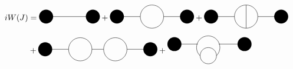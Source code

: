 \begin{equation}
    \begin{aligned}
    iW(J)&=
       \begin{gathered}
            \begin{tikzpicture}
                \draw (0,0) -- (2,0);
                \fill [black] (0,0) circle (0.3 cm);
                \fill [black] (2,0) circle (0.3 cm);
            \end{tikzpicture}
       \end{gathered}
       +\begin{gathered}
            \begin{tikzpicture}
                \fill [black] (0,0) circle (0.3 cm);
                \draw (0,0) -- (1,0);
                \draw (1.5,0) circle (0.5 cm);
                \draw (2,0) -- (3,0);
                \fill [black] (3,0) circle (0.3 cm);
            \end{tikzpicture}
       \end{gathered}+
       \begin{gathered}
            \begin{tikzpicture}
                \fill [black] (0,0) circle (0.3 cm);
                \draw (0,0) -- (1,0);
                \draw (1.5,0) circle (0.5 cm);
                \draw (2,0) -- (3,0);
                \fill [black] (3,0) circle (0.3 cm);
                \draw (1.5,0.5)--(1.5,-0.5);
            \end{tikzpicture}
       \end{gathered}\\
       &+\begin{gathered}
            \begin{tikzpicture}
                \fill [black] (0,0) circle (0.3 cm);
                \draw (0,0) -- (1,0);
                \draw (1.5,0) circle (0.5 cm);
                \draw (2,0) -- (2.5,0);
                \draw (3,0) circle (0.5 cm);
                \draw (3.5,0) -- (4.5,0);
                \fill [black] (4.5,0) circle (0.3 cm);
            \end{tikzpicture}
       \end{gathered}+
       \begin{gathered}
            \begin{tikzpicture}
                \fill [black] (0,0) circle (0.3 cm);
                \draw (0,0) -- (1,0);
                \draw (1.8,-0.5) arc (-45:225:0.5);
                \draw (1.895,0) -- (3,0);
                \fill [black] (3,0) circle (0.3 cm);
                \draw (1.45,-0.5) circle (0.35);

\end{tikzpicture}
\end{gathered}
\end{aligned}
\end{equation}
